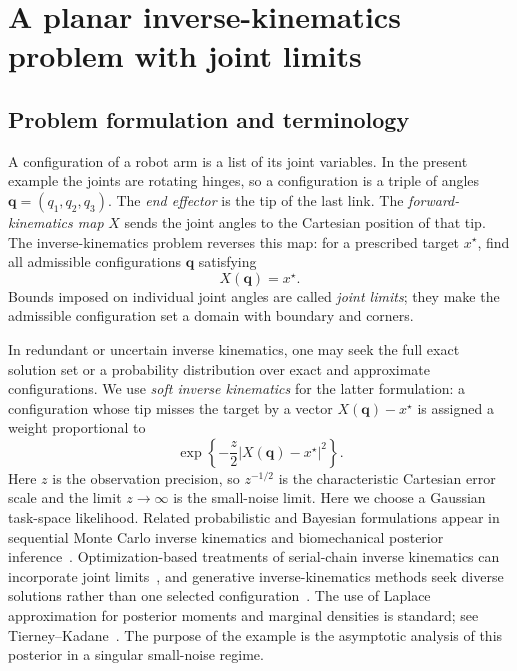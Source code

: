 \documentclass[11pt]{amsart}
\numberwithin{equation}{section}
\theoremstyle{definition}
\theoremstyle{remark}
\begin{document}
\section{A planar inverse-kinematics problem with joint limits}
\label{sec:robotics-example}

\subsection{Problem formulation and terminology}

A configuration of a robot arm is a list of its joint variables.  In the
present example the joints are rotating hinges, so a configuration is a triple
of angles $\bm q=(q_1,q_2,q_3)$.  The \emph{end effector} is the tip of the last
link.  The \emph{forward-kinematics map} $X$ sends the joint angles to the
Cartesian position of that tip.  The inverse-kinematics problem reverses this
map: for a prescribed target $x^\star$, find all admissible configurations
$\bm q$ satisfying
\[
 X(\bm q)=x^\star.
\]
Bounds imposed on individual joint angles are called \emph{joint limits};
they make the admissible configuration set a domain with boundary and corners.

In redundant or uncertain inverse kinematics, one may seek the full exact
solution set or a probability distribution over exact and approximate
configurations.  We use \emph{soft inverse kinematics} for the latter
formulation: a configuration whose tip misses the
target by a vector $X(\bm q)-x^\star$ is assigned a weight proportional to
\[
 \exp\left\{-\frac z2|X(\bm q)-x^\star|^2\right\}.
\]
Here $z$ is the observation precision, so $z^{-1/2}$ is the characteristic
Cartesian error scale and the limit $z\to\infty$ is the small-noise limit.
Here we choose a Gaussian task-space likelihood.  Related probabilistic and
Bayesian formulations appear in sequential Monte Carlo inverse kinematics and
biomechanical posterior inference~\cite{CourtyArnaudSMCIK,PatakyBayesianIK}.
Optimization-based treatments of serial-chain inverse kinematics can incorporate
joint limits~\cite{MaricEtAlIK}, and generative inverse-kinematics methods seek
diverse solutions rather than one selected configuration~\cite{AmesEtAlIKFlow}.
The use of Laplace approximation for posterior moments and marginal densities is
standard; see Tierney--Kadane~\cite{TierneyKadane}.  The purpose of the example is the
asymptotic analysis of this posterior in a singular small-noise regime.
\end{document}
